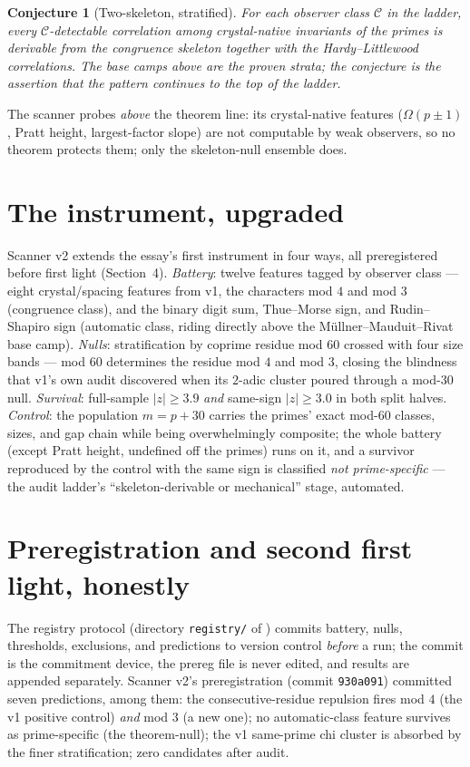 \documentclass[11pt]{article}
\newtheorem{conjecture}{Conjecture}
\theoremstyle{remark}
\begin{document}
\begin{conjecture}[Two-skeleton, stratified]
For each observer class $\mathcal{C}$ in the ladder, every $\mathcal{C}$-detectable correlation
among crystal-native invariants of the primes is derivable from the congruence skeleton together
with the Hardy--Littlewood correlations. The base camps above are the proven strata; the
conjecture is the assertion that the pattern continues to the top of the ladder.
\end{conjecture}

The scanner probes \emph{above} the theorem line: its crystal-native features ($\Omega(p \pm 1)$,
Pratt height, largest-factor slope) are not computable by weak observers, so no theorem protects
them; only the skeleton-null ensemble does.

\section{The instrument, upgraded}

Scanner v2 extends the essay's first instrument \cite{Essay} in four ways, all preregistered
before first light (Section~4). \emph{Battery}: twelve features tagged by observer class ---
eight crystal/spacing features from v1, the characters mod $4$ and mod $3$ (congruence class),
and the binary digit sum, Thue--Morse sign, and Rudin--Shapiro sign (automatic class, riding
directly above the M\"ullner--Mauduit--Rivat base camp). \emph{Nulls}: stratification by coprime
residue mod $60$ crossed with four size bands --- mod $60$ determines the residue mod $4$ and mod
$3$, closing the blindness that v1's own audit discovered when its $2$-adic cluster poured
through a mod-$30$ null. \emph{Survival}: full-sample $|z| \ge 3.9$ \emph{and} same-sign
$|z| \ge 3.0$ in both split halves. \emph{Control}: the population $m = p + 30$ carries the
primes' exact mod-$60$ classes, sizes, and gap chain while being overwhelmingly composite; the
whole battery (except Pratt height, undefined off the primes) runs on it, and a survivor
reproduced by the control with the same sign is classified \emph{not prime-specific} ---
the audit ladder's ``skeleton-derivable or mechanical'' stage, automated.

\section{Preregistration and second first light, honestly}

The registry protocol (directory \texttt{registry/} of \cite{Code}) commits battery, nulls,
thresholds, exclusions, and predictions to version control \emph{before} a run; the commit is the
commitment device, the prereg file is never edited, and results are appended separately. Scanner
v2's preregistration (commit \texttt{930a091}) committed seven predictions, among them: the
consecutive-residue repulsion fires mod $4$ (the v1 positive control) \emph{and} mod $3$ (a new
one); no automatic-class feature survives as prime-specific (the theorem-null); the v1 same-prime
chi cluster is absorbed by the finer stratification; zero candidates after audit.
\end{document}
